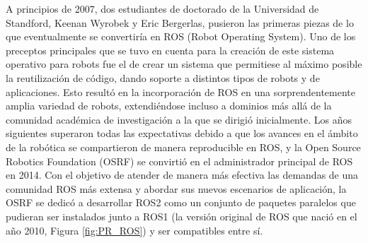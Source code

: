   
  
A principios de 2007, dos estudiantes de doctorado de la Universidad de Standford, Keenan Wyrobek y Eric Bergerlas, pusieron las primeras piezas de lo que eventualmente se convertiría en ROS (Robot Operating System). Uno de los preceptos principales que se tuvo en cuenta para la creación de este sistema operativo para robots fue el de crear un sistema que permitiese al máximo posible la reutilización de código, dando soporte a distintos tipos de robots y de aplicaciones. Esto resultó en la incorporación de ROS en una sorprendentemente amplia variedad de robots, extendiéndose incluso a dominios más allá de la comunidad académica de investigación a la que se dirigió inicialmente. Los años siguientes superaron todas las expectativas debido a que los avances en el ámbito de la robótica se compartieron de manera reproducible en ROS, y la Open Source Robotics Foundation (OSRF) se convirtió en el administrador principal de ROS en 2014. Con el objetivo de atender de manera más efectiva las demandas de una comunidad ROS más extensa y abordar sus nuevos escenarios de aplicación, la OSRF se dedicó a desarrollar ROS2 como un conjunto de paquetes paralelos que pudieran ser instalados junto a ROS1 (la versión original de ROS que nació en el año 2010, Figura \ref{fig:PR_ROS}) y ser compatibles entre sí. %
  
